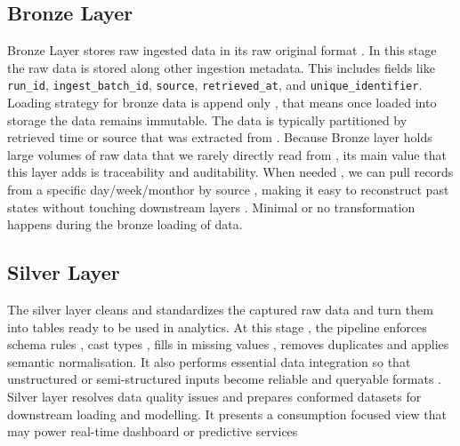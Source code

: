 \subsection{Bronze Layer}
Bronze Layer stores raw ingested data in its raw original format \cite{mohna:2022} . In this stage the raw data is stored along other ingestion metadata. This includes fields like \texttt{run\_id}, \texttt{ingest\_batch\_id}, \texttt{source}, \texttt{retrieved\_at}, and \texttt{unique\_identifier}. Loading strategy for bronze data is append only , that means once loaded into storage the data remains immutable. The data is typically partitioned by retrieved time or source that was extracted from \cite{gujjala:2024}. Because Bronze layer holds large volumes of raw data that we rarely directly read from , its main value that this layer adds is traceability and auditability. When needed , we can pull records from a specific day/week/monthor by source , making it easy to reconstruct past states without touching downstream layers \cite{gujjala:2024}. Minimal or no transformation happens during the bronze loading of data.

\subsection{Silver Layer}
The silver layer cleans and standardizes the captured raw data and turn them into tables ready to be used in analytics. At this stage , the pipeline enforces schema rules , cast types , fills in missing values , removes duplicates and applies semantic normalisation. It also performs essential data integration so that unstructured or semi-structured inputs become reliable and queryable formats \cite{nieto:2019}. Silver layer resolves data quality issues and prepares conformed datasets for downstream loading and modelling. It presents a consumption focused view that may power real-time dashboard or predictive services

